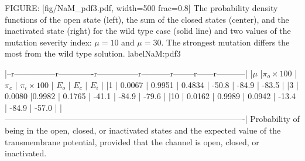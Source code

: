 FIGURE: [fig/NaM_pdf3.pdf, width=500 frac=0.8] The probability density functions of the open state (left),
the sum of the closed states  (center), and the inactivated state (right) 
for the wild type case (solid line) and two values of the mutation severity 
index: $\mu=10$ and $\mu=30$. The strongest mutation differs the most
from the wild type solution. 
 label{NaM:pdf3}%



|--r---------------r-------------r---------------r-----------r--------r------r-----------|
|$\mu$  |$\pi_o\times 100 $ | $\pi_c$ | $\pi_i\times 100$ | $E_o$ | $E_c$ | $E_i$        |
|1      | 0.0067            | 0.9951  | 0.4834            | -50.8 | -84.9 | -83.5        |
|3      | 0.0080            |0.9982   | 0.1765            | -41.1 | -84.9 | -79.6        |
|10     | 0.0162            | 0.9989  | 0.0942            | -13.4 | -84.9 | -57.0        |
|----------------------------------------------------------------------------------------|
Probability of being in the open, closed, or inactivated states and the expected value of the transmembrane
potential, provided that the channel is open, closed, or inactivated.





